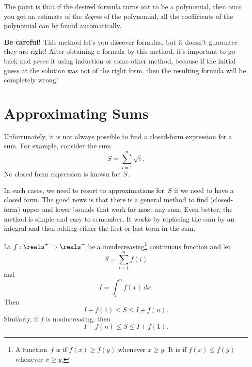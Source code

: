 The point is that if the desired formula turns out to be a polynomial,
then once you get an estimate of the \emph{degree} of the polynomial,
all the coefficients of the polynomial can be found automatically.

\textbf{Be careful!}  This method let's you discover formulas, but it
doesn't guarantee they are right!  After obtaining a formula by this
method, it's important to go back and \emph{prove} it using induction
or some other method, because if the initial guess at the solution was
not of the right form, then the resulting formula will be completely
wrong!

\section{Approximating Sums}

Unfortunately, it is not always possible to find a closed-form
expression for a sum.  For example, consider the sum
\begin{equation*}
    S = \sum_{i = 1}^n \sqrt{i}.
\end{equation*}
No closed form expression is known for~$S$.

In such cases, we need to resort to approximations for~$S$ if we need
to have a closed form.  The good news is that there is a general
method to find (closed-form) upper and lower bounds that work for most
any sum.  Even better, the method is simple and easy to remember.  It
works by replacing the sum by an integral and then adding either the
first or last term in the sum.

\begin{theorem}\label{thm:9G3}
Lt $f: \reals^+ \to \reals^+$ be a nondecreasing\footnote{A
  function~$f$ is  if $f(x) \ge f(y)$ whenever $x
  \ge y$.  It is  if $f(x) \le f(y)$ whenever $x
  \ge y$.} continuous function and let
\begin{equation*}
    S = \sum_{i = 1}^n f(i)
\end{equation*}
and
\begin{equation*}
    I = \int_i^n f(x)\, dx.
\end{equation*}
Then
\begin{equation*}
    I + f(1) \le S \le I + f(n).
\end{equation*}
Similarly, if $f$ is nonincreasing, then
\begin{equation*}
    I + f(n) \le S \le I + f(1).
\end{equation*}
\end{theorem}

